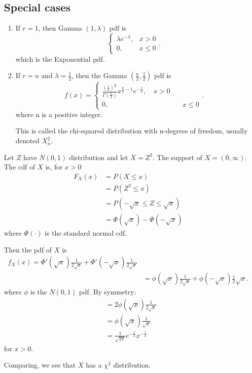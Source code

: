 \subsection{Special cases}
\begin{enumerate}
	\item If $r = 1$, then Gamma $\left( 1, \lambda \right) $ pdf is 
		\[
		\begin{cases}
			\lambda e ^{ -\lambda}, & x > 0 \\
			0, & x \le  0
		\end{cases}
		.\] 
		which is the Exponential pdf.
	\item If $r = n$ and $\lambda = \frac{1}{2}$, then the Gamma $\left( \frac{n}{2}, \frac{1}{2} \right) $ pdf is 
		\[
			f\left( x \right) = \begin{cases}
				\frac{\left( \frac{1}{2} \right) ^{\frac{n}{2}}}{\Gamma\left( \frac{n}{2} \right) }x ^{ \frac{n}{2} - 1}e ^{ -\frac{x}{2}}, \quad x > 0 \\
				0, & \quad x \le  0
			\end{cases}
		.\] 
		where n is a positive integer.

		This is called the chi-squared distribution with n-degrees of freedom, usually denoted $X^2_{n}$.
\end{enumerate}

Let $Z$ have $N\left( 0, 1 \right) $ distribution and let $X = Z^2$. The support of $X = \left( 0, \infty \right) $. The cdf of $X$ is, for $x > 0$ 
\begin{align*}
	F_{X}\left( x \right)  &= P\left( X\le  x \right) \\
	&= P\left( Z^2 \le  x \right)  \\
	&= P\left( -\sqrt{x} \le  Z \le  \sqrt{x}  \right)\\
	&= \Phi\left( \sqrt{x}  \right)  - \Phi\left( -\sqrt{x}  \right) 
\end{align*}
where $\Phi\left( \cdot \right) $ is the standard normal cdf. 

Then the pdf of $X$ is 
\begin{align*}
	f _{X}\left( x \right)  = \Phi ' \left( \sqrt{x}  \right) \frac{1}{2 \sqrt{x} } + \Phi ' \left( -\sqrt{x}  \right) \frac{1}{2 \sqrt{x} }\\
	&= \phi \left( \sqrt{x}  \right) \frac{1}{2 \sqrt{x} } + \phi\left( -\sqrt{x}  \right) \frac{1}{2} \sqrt{x} 
.\end{align*}
where $\phi$ is the $N\left( 0, 1 \right) $ pdf. By symmetry:
\begin{align*}
	&= 2 \phi\left( \sqrt{x}  \right) \frac{1}{2\sqrt{x} } \\
	&= \phi\left( \sqrt{x}  \right) \frac{1}{\sqrt{x} } \\
	&= \frac{1}{\sqrt{2 \pi} }e ^{-\frac{x}{2}} x ^{-\frac{1}{2}}
\end{align*}
for $x > 0$. 

Comparing, we see that $X$ has a $\chi^2$ distribution.
